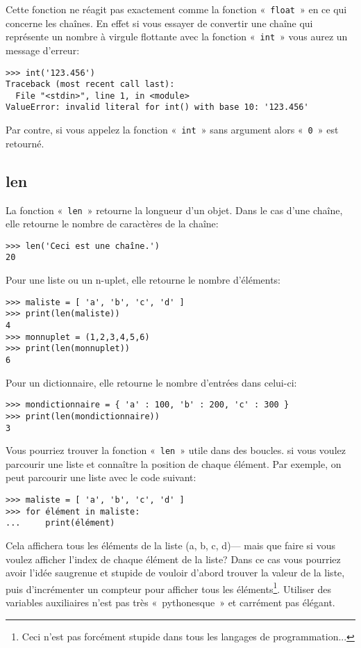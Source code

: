 Cette fonction ne réagit pas exactement comme la fonction «~\texttt{float}~» en ce qui concerne les chaînes. En effet si vous essayer de convertir une chaîne qui représente un nombre à virgule flottante avec la fonction «~\texttt{int}~» vous aurez un message d'erreur:
\begin{Verbatim}[frame=single,rulecolor=\color{gray}]
>>> int('123.456')
Traceback (most recent call last):
  File "<stdin>", line 1, in <module>
ValueError: invalid literal for int() with base 10: '123.456'
\end{Verbatim}

Par contre, si vous appelez la fonction «~\texttt{int}~»  sans argument alors «~\texttt{0}~» est retourné.

\subsection*{len}

La fonction «~\texttt{len}~» retourne la longueur d'un objet. Dans le cas d'une chaîne, elle retourne le nombre de caractères de la chaîne:
\begin{Verbatim}[frame=single,rulecolor=\color{gray}]
>>> len('Ceci est une chaîne.')
20
\end{Verbatim}

Pour une liste ou un n-uplet, elle retourne le nombre d'éléments:
\begin{Verbatim}[frame=single,rulecolor=\color{gray}]
>>> maliste = [ 'a', 'b', 'c', 'd' ]
>>> print(len(maliste))
4
>>> monnuplet = (1,2,3,4,5,6)
>>> print(len(monnuplet))
6
\end{Verbatim}

Pour un dictionnaire, elle retourne le nombre d'entrées dans celui-ci:
\begin{Verbatim}[frame=single,rulecolor=\color{gray}]
>>> mondictionnaire = { 'a' : 100, 'b' : 200, 'c' : 300 }
>>> print(len(mondictionnaire))
3
\end{Verbatim}

Vous pourriez trouver la fonction «~\texttt{len}~» utile dans des boucles.
si vous voulez parcourir une liste et connaître la position de chaque élément. Par exemple, on peut parcourir une liste avec le code suivant:
\begin{Verbatim}[frame=single,rulecolor=\color{gray}]
>>> maliste = [ 'a', 'b', 'c', 'd' ]
>>> for élément in maliste:
...     print(élément)
\end{Verbatim}
Cela affichera tous les éléments de la liste (a, b, c, d)--- mais que faire si vous voulez afficher l'index de chaque élément de la liste? Dans ce cas vous pourriez avoir l'idée saugrenue et stupide de vouloir d'abord trouver la valeur de la liste, puis d'incrémenter un compteur pour afficher tous les éléments\footnote{Ceci n'est pas forcément stupide dans tous les langages de programmation...}. Utiliser des variables auxiliaires n'est pas très «~pythonesque~» et carrément pas élégant.

